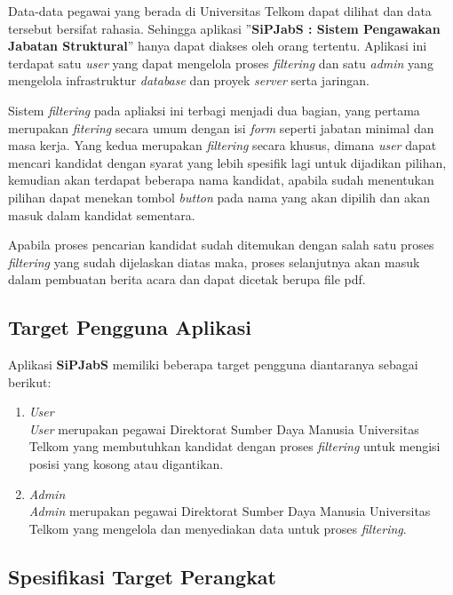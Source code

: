 Data-data pegawai yang berada di Universitas Telkom dapat dilihat dan data tersebut bersifat rahasia. Sehingga aplikasi ”\textbf{SiPJabS : Sistem Pengawakan Jabatan Struktural}” hanya dapat diakses oleh orang tertentu. Aplikasi ini terdapat satu \textit{user} yang dapat mengelola proses \textit{filtering} dan satu \textit{admin} yang mengelola infrastruktur \textit{database} dan proyek \textit{server} serta jaringan.  

Sistem \textit{filtering} pada apliaksi ini terbagi menjadi dua bagian, yang pertama merupakan \textit{fitering} secara umum dengan isi \textit{form} seperti jabatan minimal dan masa kerja. Yang kedua merupakan \textit{filtering} secara khusus, dimana \textit{user} dapat mencari kandidat dengan syarat yang lebih spesifik lagi untuk dijadikan pilihan, kemudian akan terdapat beberapa nama kandidat, apabila sudah menentukan pilihan dapat menekan tombol \textit{button} pada nama yang akan dipilih dan akan masuk dalam kandidat sementara.

Apabila proses pencarian kandidat sudah ditemukan dengan salah satu proses \textit{filtering} yang sudah dijelaskan diatas maka, proses selanjutnya akan masuk dalam pembuatan berita acara dan dapat dicetak berupa file pdf.  

\subsection{Target Pengguna Aplikasi}

Aplikasi \textbf{SiPJabS} memiliki beberapa target pengguna diantaranya sebagai berikut:

\begin{enumerate}
\item \textit{User} \\
\textit{User} merupakan pegawai Direktorat Sumber Daya Manusia Universitas Telkom yang membutuhkan kandidat dengan proses \textit{filtering} untuk mengisi posisi yang kosong atau digantikan.

\item \textit{Admin} \\
\textit{Admin} merupakan pegawai  Direktorat Sumber Daya Manusia Universitas Telkom yang mengelola dan menyediakan data untuk proses \textit{filtering}.
\end{enumerate}

\subsection{Spesifikasi Target Perangkat}

